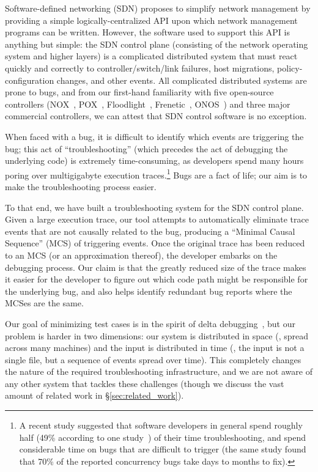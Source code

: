 Software-defined networking (SDN) proposes to simplify network management by
providing a simple logically-centralized API upon which network management
programs can be written. However, the software used to support this API is
anything but simple: the SDN control plane (consisting of the network
operating system and higher layers) is a complicated distributed system that
must react quickly and correctly to controller/switch/link failures, host migrations,
policy-configuration changes, and other events.
All complicated distributed systems are prone to bugs, and from our first-hand
familiarity with five open-source controllers (NOX~\cite{nox},
POX~\cite{pox}, Floodlight~\cite{floodlight},
Frenetic~\cite{frenetic}, ONOS~\cite{ONOS}) and three major commercial controllers, we can
attest that SDN control software is no exception.

When faced with a bug, it is difficult to identify which events are triggering the
bug; this act of ``troubleshooting'' (which precedes the act of debugging the
underlying code) is extremely time-consuming, as developers spend many hours poring
over multigigabyte execution traces.\footnote{A recent study suggested that software developers in general spend roughly half (49\% according to one
study~\cite{msoft_concurrency}) of their time troubleshooting, and spend
considerable time on bugs that are difficult to trigger (the same study found
that 70\% of the reported concurrency bugs take days to months to fix).} Bugs
are a fact of life; our aim is to make the troubleshooting process easier.

To that end, we have built a troubleshooting system for the SDN control plane.
Given a large execution trace, our tool attempts to automatically eliminate
trace events that are not causally related to the bug, producing a ``Minimal
Causal Sequence'' (MCS) of triggering events. Once the original trace has
been reduced to an MCS (or an approximation thereof), the developer embarks
on the debugging process. Our claim is that the greatly reduced size of the
trace makes it easier for the developer to figure out which code path might be
responsible for the underlying bug, and also helps identify redundant bug
reports where the MCSes are the same.

Our goal of minimizing test cases is in the spirit of delta debugging~\cite{Zeller:1999:YMP:318773.318946}, but our
problem is harder in two dimensions: our system is distributed in space (\ie,
spread across many machines) and the input is distributed in time (\ie, the
input is not a single file, but a sequence of events spread over time). This
completely changes the nature of the required troubleshooting infrastructure,
and we are not aware of any other system that tackles these challenges (though
we discuss the vast amount of related work in \S\ref{sec:related_work}).

